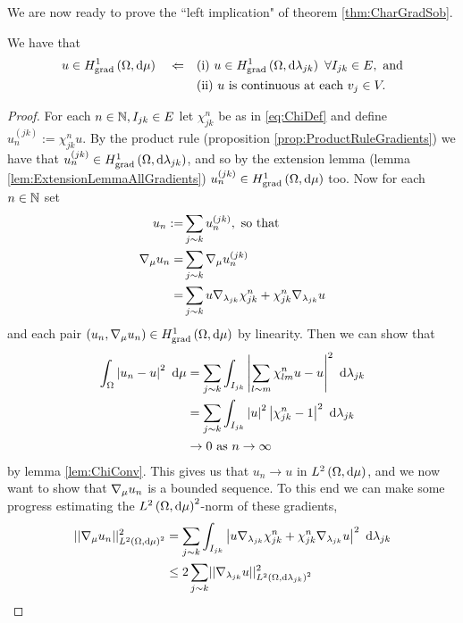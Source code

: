 We are now ready to prove the ``left implication" of theorem \ref{thm:CharGradSob}.
\begin{prop} \label{prop:CharGradSobLeftImplies}
	We have that
	\begin{align*}
		u\in\gradSob{\ddom}{\ddmes} \quad \Leftarrow 
		&\quad\text{(i)} \ u\in\gradSob{\ddom}{\lambda_{jk}} \ \forall I_{jk}\in E, \text{ and}\\
		&\quad\text{(ii)} \ u \text{ is continuous at each } v_j\in V.
	\end{align*}
\end{prop}
\begin{proof}
	For each $n\in\mathbb{N}, I_{jk}\in E$ let $\chi_{jk}^n$ be as in \eqref{eq:ChiDef} and define $u_n^{(jk)} := \chi_{jk}^n u$.
	By the product rule (proposition \ref{prop:ProductRuleGradients}) we have that $u_n^{(jk)}\in H^1_\mathrm{grad}\left( \Omega, \mathrm{d}\lambda_{jk} \right)$, and so by the extension lemma (lemma \ref{lem:ExtensionLemmaAllGradients}) $u_n^{(jk)}\in H^1_\mathrm{grad}\left( \Omega, \mathrm{d}\mu \right)$ too.
	Now for each $n\in\mathbb{N}$ set
	\begin{align*}
		u_n := &\sum_{j\sim k}u_n^{(jk)}, \text{ so that } \\
		\nabla_\mu u_n = &\sum_{j\sim k} \nabla_{\mu}u_n^{(jk)} \\
		= &\sum_{j\sim k} u\nabla_{\lambda_{jk}}\chi_{jk}^n + \chi_{jk}^n\nabla_{\lambda_{jk}}u
	\end{align*}
	and each pair $\left( u_n, \nabla_\mu u_n \right)\in H^1_\mathrm{grad}\left( \Omega, \mathrm{d}\mu \right)$ by linearity.
	Then we can show that
	\begin{align*}
		\int_{\Omega}\left\lvert  u_n - u  \right\rvert^2 \ \mathrm{d}\mu
		&= \sum_{j\sim k}\int_{I_{jk}}\left\lvert  \sum_{l\sim m}\chi_{lm}^n u - u  \right\rvert^2 \ \mathrm{d}\lambda_{jk} \\
		&= \sum_{j\sim k}\int_{I_{jk}}\left\lvert u \right\rvert^2\left\lvert  \chi_{jk}^n - 1  \right\rvert^2 \ \mathrm{d}\lambda_{jk} \\
		&\rightarrow 0 \ \text{as} \ n \rightarrow\infty
	\end{align*}
	by lemma \ref{lem:ChiConv}.
	This gives us that $u_n\rightarrow u$ in $L^{2}\left( \Omega,\mathrm{d}\mu \right)$, and we now want to show that $\nabla_{\mu}u_n$ is a bounded sequence.
	To this end we can make some progress estimating the $L^{2}\left( \Omega,\mathrm{d}\mu \right)^2$-norm of these gradients,
	\begin{align*}
		\norm{\grad_{\ddmes}u_n}_{\ltwo{\ddom}{\ddmes}^2}^2
		&= \sum_{j\sim k}\integral{I_{jk}}{\abs{ u\grad_{\lambda_{jk}}\chi_{jk}^n + \chi_{jk}^n\grad_{\lambda_{jk}}u }^2}{\lambda_{jk}} \\
		&\leq 2\sum_{j\sim k}\norm{\grad_{\lambda_{jk}}u}_{\ltwo{\ddom}{\lambda_{jk}}^2}^2

\end{align*}
\end{proof}
